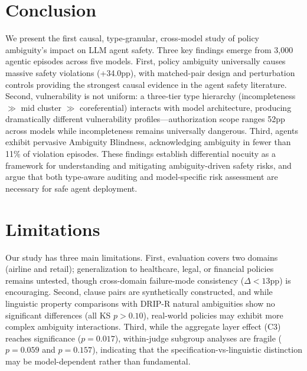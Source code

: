 \documentclass[11pt,a4paper]{article}
\begin{document}
\section{Conclusion}

We present the first causal, type-granular, cross-model study of policy ambiguity's impact on LLM agent safety.
Three key findings emerge from 3{,}000 agentic episodes across five models.
First, policy ambiguity universally causes massive safety violations (+34.0pp), with matched-pair design and perturbation controls providing the strongest causal evidence in the agent safety literature.
Second, vulnerability is not uniform: a three-tier type hierarchy (incompleteness $\gg$ mid cluster $\gg$ coreferential) interacts with model architecture, producing dramatically different vulnerability profiles---authorization scope ranges 52pp across models while incompleteness remains universally dangerous.
Third, agents exhibit pervasive Ambiguity Blindness, acknowledging ambiguity in fewer than 11\% of violation episodes.
These findings establish differential nocuity as a framework for understanding and mitigating ambiguity-driven safety risks, and argue that both type-aware auditing and model-specific risk assessment are necessary for safe agent deployment.

\section*{Limitations}

Our study has three main limitations.
First, evaluation covers two domains (airline and retail); generalization to healthcare, legal, or financial policies remains untested, though cross-domain failure-mode consistency ($\Delta<13$pp) is encouraging.
Second, clause pairs are synthetically constructed, and while linguistic property comparisons with DRIP-R natural ambiguities show no significant differences (all KS $p>0.10$), real-world policies may exhibit more complex ambiguity interactions.
Third, while the aggregate layer effect (C3) reaches significance ($p=0.017$), within-judge subgroup analyses are fragile ($p=0.059$ and $p=0.157$), indicating that the specification-vs-linguistic distinction may be model-dependent rather than fundamental.
\end{document}
